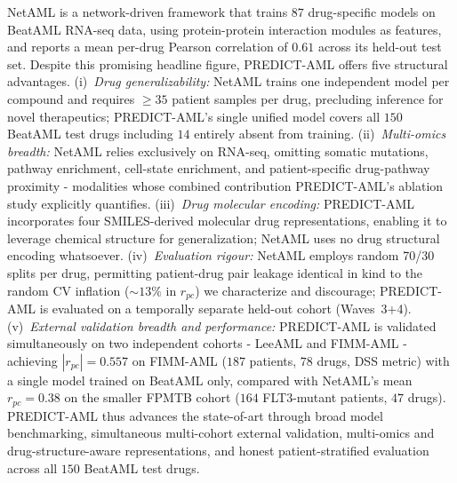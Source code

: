 \documentclass[pdflatex,sn-mathphys-num]{sn-jnl}
\theoremstyle{thmstyleone}
\theoremstyle{thmstyletwo}
\theoremstyle{thmstylethree}
\begin{document}
NetAML \cite{wang2025netaml} is a network-driven framework that trains $87$ drug-specific models on BeatAML RNA-seq data, using protein-protein interaction modules as features, and reports a mean per-drug Pearson correlation of $0.61$ across its held-out test set. Despite this promising headline figure, PREDICT-AML offers five structural advantages. (i)~\textit{Drug generalizability:} NetAML trains one independent model per compound and requires $\geq\!35$ patient samples per drug, precluding inference for novel therapeutics; PREDICT-AML's single unified model covers all $150$ BeatAML test drugs including $14$ entirely absent from training. (ii)~\textit{Multi-omics breadth:} NetAML relies exclusively on RNA-seq, omitting somatic mutations, pathway enrichment, cell-state enrichment, and patient-specific drug-pathway proximity - modalities whose combined contribution PREDICT-AML's ablation study explicitly quantifies. (iii)~\textit{Drug molecular encoding:} PREDICT-AML incorporates four SMILES-derived molecular drug representations, enabling it to leverage chemical structure for generalization; NetAML uses no drug structural encoding whatsoever. (iv)~\textit{Evaluation rigour:} NetAML employs random 70/30 splits per drug, permitting patient-drug pair leakage identical in kind to the random CV inflation ($\sim\!13\%$ in $r_{pc}$) we characterize and discourage; PREDICT-AML is evaluated on a temporally separate held-out cohort (Waves~3+4). (v)~\textit{External validation breadth and performance:} PREDICT-AML is validated simultaneously on two independent cohorts - LeeAML and FIMM-AML - achieving $|r_{pc}| = 0.557$ on FIMM-AML ($187$ patients, $78$ drugs, DSS metric) with a single model trained on BeatAML only, compared with NetAML's mean $r_{pc} = 0.38$ on the smaller FPMTB cohort ($164$ FLT3-mutant patients, $47$ drugs). PREDICT-AML thus advances the state-of-art through broad model benchmarking, simultaneous multi-cohort external validation, multi-omics and drug-structure-aware representations, and honest patient-stratified evaluation across all $150$ BeatAML test drugs.
\end{document}
